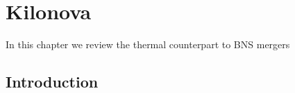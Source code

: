 \chapter{Kilonova} \label{ch:kilonova} 

In this chapter we review the thermal counterpart to \ac{BNS} mergers 


\section{Introduction}



